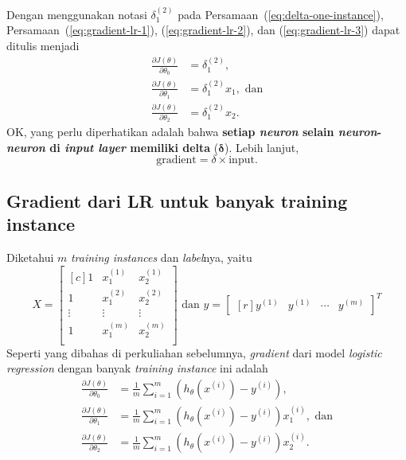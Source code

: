 \documentclass[12pt]{article}
\begin{document}
Dengan menggunakan notasi $\delta^{(2)}_1$ pada Persamaan~(\ref{eq:delta-one-instance}), Persamaan~(\ref{eq:gradient-lr-1}), (\ref{eq:gradient-lr-2}), dan (\ref{eq:gradient-lr-3}) dapat ditulis menjadi
\begin{align}
	\frac{\partial J(\theta)}{\partial \theta_0} &= \delta^{(2)}_1, \label{eq:gradient-lr-delta-1} \\
	\frac{\partial J(\theta)}{\partial \theta_1} &= \delta^{(2)}_1 x_1, \text{ dan} \label{eq:gradient-lr-delta-2} \\	
	\frac{\partial J(\theta)}{\partial \theta_2} &= \delta^{(2)}_1 x_2. \label{eq:gradient-lr-delta-3}	
\end{align}
OK, yang perlu diperhatikan adalah bahwa \textbf{setiap \textit{neuron} selain \textit{neuron}-\textit{neuron} di \textit{input layer} memiliki delta} ($\bm{\delta}$). Lebih lanjut,
\begin{equation*}
	\boxed{
	\text{gradient} =  \delta \times \text{input}.
	}
\end{equation*}

\subsection*{Gradient dari LR untuk banyak training instance}
Diketahui $m$ \textit{training instances} dan \textit{label}nya, yaitu 
\begin{equation*}
X = \begin{bmatrix}[c]
	1       & x^{(1)}_1 & x^{(1)}_2 \\
	1       & x^{(2)}_1 & x^{(2)}_2 \\	
	\vdots  & \vdots    & \vdots \\
	1       & x^{(m)}_1 & x^{(m)}_2 \\		 
\end{bmatrix} \text{ dan } y = \begin{bmatrix}[r]
	y^{(1)} & y^{(1)} & \cdots & y^{(m)}
\end{bmatrix}^T	
\end{equation*} 
Seperti yang dibahas di perkuliahan sebelumnya, \textit{gradient} dari model \textit{logistic regression} dengan banyak \textit{training instance} ini adalah
\begin{align}
	\frac{\partial J(\theta)}{\partial \theta_0} &= \frac{1}{m} \sum_{i=1}^{m}{(h_\theta(x^{(i)}) - y^{(i)})}, \label{eq:gradient-lr-multi-1} \\
	\frac{\partial J(\theta)}{\partial \theta_1} &= \frac{1}{m} \sum_{i=1}^{m}{(h_\theta(x^{(i)}) - y^{(i)}) x_1^{(i)}}, \text{ dan} \label{eq:gradient-lr-multi-2} \\	
	\frac{\partial J(\theta)}{\partial \theta_2} &= \frac{1}{m} \sum_{i=1}^{m}{(h_\theta(x^{(i)}) - y^{(i)}) x_2^{(i)}}. \label{eq:gradient-lr-multi-3}	
\end{align}
\end{document}
